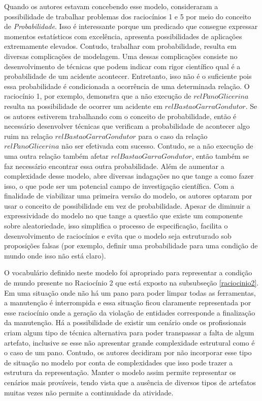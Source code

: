 Quando os autores estavam concebendo esse modelo, consideraram a possibilidade de trabalhar problemas dos raciocínios 1 e 5 por meio do conceito de \textit{Probabilidade}. Isso é interessante porque um predicado que consegue expressar momentos estatísticos com excelência, apresenta possibilidades de aplicações extremamente elevados. Contudo, trabalhar com probabilidade, resulta em diversas complicações de modelagem. Uma dessas complicações consiste no desenvolvimento de técnicas que podem indicar com rigor científico qual é a probabilidade de um acidente acontecer. Entretanto, isso não é o suficiente pois essa probabilidade é condicionada a ocorrência de uma determinada relação. O raciocínio 1, por exemplo, demonstra que a não execução de $relPanoGlicerina$ resulta na possibilidade de ocorrer um acidente em $relBastaoGarraGondutor$. Se os autores estiverem trabalhando com o conceito de probabilidade, então é necessário desenvolver técnicas que verificam a probabilidade de acontecer algo ruim na relação $relBastaoGarraGondutor$ para o caso da relação $relPanoGlicerina$ não ser efetivada com sucesso. Contudo, se a não execução de uma outra relação também afetar $relBastaoGarraGondutor$, então também se faz necessário encontrar essa outra probabilidade. Além de aumentar a complexidade desse modelo, abre diversas indagações no que tange a como fazer isso, o que pode ser um potencial campo de investigação científica. Com a finalidade de viabilizar uma primeira versão do modelo, os autores optaram por usar o conceito de possibilidade em vez de probabilidade. Apesar de diminuir a expressividade do modelo no que tange a questão que existe um componente sobre aleatoriedade, isso simplifica o processo de especificação, facilita o desenvolvimento de raciocínios e evita que o modelo seja estruturado sob proposições falsas (por exemplo, definir uma probabilidade para uma condição 
de mundo onde isso não está claro). 

O vocabulário definido neste modelo foi apropriado para representar a condição de mundo presente no Raciocínio 2 que está exposto na subsubseção \ref{raciocinio2}. Em uma situação onde não há um pano para poder limpar todas as ferramentas, a manutenção é interrompida e essa situação ficou claramente representada por esse raciocínio onde a geração da violação de entidades corresponde a finalização da manutenção. Há a possibilidade de existir um cenário onde os profissionais criam algum tipo de técnica alternativa para poder transpassar a falta de algum artefato, inclusive se esse não apresentar grande complexidade estrutural como é o caso de um pano. Contudo, os autores decidiram por não incorporar esse tipo de situação no modelo por conta de complexidades que isso pode trazer a estrutura da representação. Manter o modelo assim permite representar os cenários mais prováveis, tendo vista que a ausência de diversos tipos de artefatos muitas vezes não permite a continuidade da atividade.    

